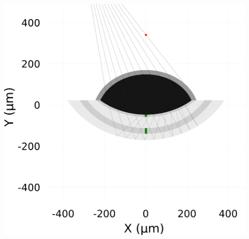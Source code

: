 \documentclass[a1paper]{betterposter}
\begin{document}
{    \begin{center}
        \includegraphics[width=0.95\textwidth]{img/abnormal}
    \end{center}

}
\end{document}
